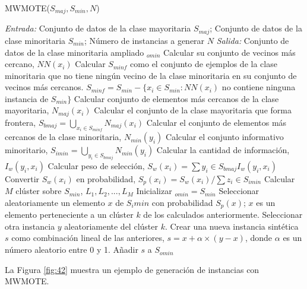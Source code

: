 \newpage

\begin{algorithm}[H]
	\caption{MWMOTE($S_{maj},S_{min},N$)}
	\label{algo:mwmote}
	\begin{algorithmic}[0]
		\State \textit{Entrada:} Conjunto de datos de la clase mayoritaria $S_{maj}$; Conjunto de datos de la clase minoritaria $S_{min}$; Número de instancias a generar $N$
		\State \textit{Salida:} Conjunto de datos de la clase minoritaria ampliado $_{omin}$
			\State Calcular su conjunto de vecinos más cercano, $NN(x_i)$
		\EndFor
		\State Calcular $S_{minf}$ como el conjunto de ejemplos de la clase minoritaria que no tiene ningún vecino de la clase minoritaria en su conjunto de vecinos más cercanos. $S_{minf} = S_{min} - \{x_i \in S_{min} : NN(x_i) $ no contiene ninguna instancia de $S_{min}  \}$
			\State Calcular conjunto de elementos más cercanos de la clase mayoritaria, $N_{maj}(x_i)$
		\EndFor
		\State Calcular el conjunto de la clase mayoritaria que forma frontera, $S_{bmaj} = \bigcup_{x_i \in S_{minf} } N_{maj}(x_i)$
			\State Calcular el conjunto de elementos más cercanos de la clase minoritaria, $N_{min} (y_i)$
		\EndFor
		\State Calcular el conjunto informativo minoritario, $S_{imin} = \bigcup_{y_i \in S_{bmaj}} N_{min}(y_i)$
			\State Calcular la cantidad de información, $I_w(y_i,x_i)$
		\EndFor
			\State Calcular peso de selección, $S_w(x_i) = \sum{y_i \in S_{bmaj}} I_w(y_i,x_i)$
		\EndFor
			\State Convertir $S_w(x_i)$ en probabilidad, $S_p(x_i) = S_w(x_i)/\sum{z_i \in S_{imin}}$
		\EndFor
		\State Calcular $M$ clúster sobre $S_{min}$, $L_1, L_2, ..., L_M$
		\State Inicializar $_{omin} = S_{min}$
			\State Seleccionar aleatoriamente un elemento $x$ de $S_imin$ con probabilidad $S_p(x)$; $x$ es un elemento perteneciente a un clúster $k$ de los calculados anteriormente.
			\State Seleccionar otra instancia $y$ aleatoriamente del clúster $k$.
			\State Crear una nueva instancia sintética $s$ como combinación lineal de las anteriores, $s = x + \alpha \times (y-x)$, donde $\alpha$ es un número aleatorio entre 0 y 1.
			\State Añadir $s$ a $S_{omin}$
		\EndFor
	\end{algorithmic}
\end{algorithm}

La Figura \ref{fig:42} muestra un ejemplo de generación de instancias con MWMOTE.\newline

